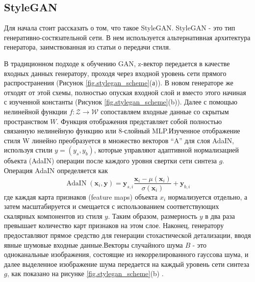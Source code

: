 \subsection{StyleGAN}
Для начала стоит рассказать о том, что такое StyleGAN. StyleGAN - это тип генеративно-состязательной сети. В нем используется альтернативная архитектура генератора, заимствованная из статьи о передачи стиля. \cite{styletransfer}

В традиционном подходе к обучению GAN, z-вектор передается в качестве входных данных генератору, проходя через входной уровень сети прямого распространения (Рисунок {\color{blue} \ref{fig.stylegan_scheme}}(а)). В новом генераторе же отходят от этой схемы, полностью опуская входной слой и вместо этого начиная с изученной константы (Рисунок {\color{blue} \ref{fig.stylegan_scheme}}(b)). Далее с помощью нелинейной функции $f : \mathcal{Z} \rightarrow \mathcal{W}$ сопоставляем входные данные со скрытым пространством $W$. Функция отображения представляет собой полностью связанную нелинейную функцию или 8-слойный MLP.Изученное отображение стиля W линейно преобразуется в множество векторов “A” для слоя AdaIN, используя стили $y = (y_s, y_b)$, которые управляют адаптивной нормализацией объекта (AdaIN) операции после каждого уровня свертки сети синтеза $g$. Операция AdaIN определяется как
\begin{equation}
    \operatorname{AdaIN}\left(\mathbf{x}_{i}, \mathbf{y}\right)=\mathbf{y}_{s, i} \frac{\mathbf{x}_{i}-\mu\left(\mathbf{x}_{i}\right)}{\sigma\left(\mathbf{x}_{i}\right)}+\mathbf{y}_{b, i}
\end{equation}
где каждая карта признаков (feature maps) объекта $x_i$ нормализуется отдельно, а затем масштабируется и смещается с использованием соответствующих скалярных компонентов из стиля $y$. Таким образом, размерность $y$ в два раза превышает количество карт признаков на этом слое. Наконец, генератору предоставляют прямое средство для генерации стохастической детализации, вводя явные шумовые входные данные.Векторы случайного шума $B$ - это одноканальные изображения, состоящие из некоррелированного гауссова шума, и далее выделенное изображение шума передается на каждый уровень сети синтеза $g$, как показано на рисунке {\color{blue} \ref{fig.stylegan_scheme}}(b) \cite{StyleGAN}.

